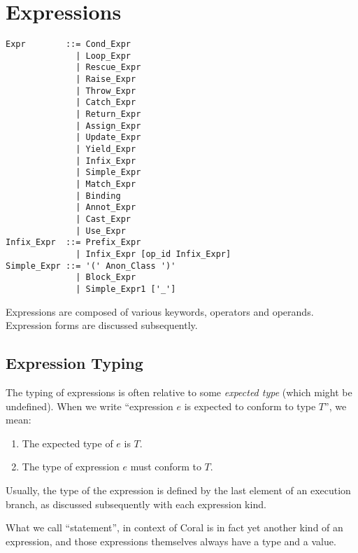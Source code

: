 
\chapter{Expressions}


\syntax\begin{lstlisting}
Expr        ::= Cond_Expr
              | Loop_Expr
              | Rescue_Expr
              | Raise_Expr
              | Throw_Expr
              | Catch_Expr
              | Return_Expr
              | Assign_Expr
              | Update_Expr
              | Yield_Expr
              | Infix_Expr
              | Simple_Expr
              | Match_Expr
              | Binding
              | Annot_Expr
              | Cast_Expr
              | Use_Expr
Infix_Expr  ::= Prefix_Expr
              | Infix_Expr [op_id Infix_Expr]
Simple_Expr ::= '(' Anon_Class ')'
              | Block_Expr
              | Simple_Expr1 ['_']
\end{lstlisting}

Expressions are composed of various keywords, operators and operands. Expression forms are discussed subsequently. 







\section{Expression Typing}

The typing of expressions is often relative to some {\em expected type} (which might be undefined). When we write ``expression $e$ is expected to conform to type $T$'', we mean:
\begin{enumerate}
\item The expected type of $e$ is $T$.
\item The type of expression $e$ must conform to $T$. 
\end{enumerate}

Usually, the type of the expression is defined by the last element of an execution branch, as discussed subsequently with each expression kind. 

What we call ``statement'', in context of Coral is in fact yet another kind of an expression, and those expressions themselves always have a type and a value. 





